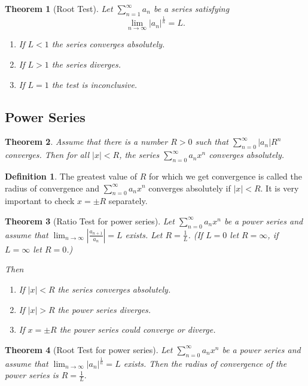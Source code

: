 \documentclass[11pt,a4paper]{article}
\newcommand\sumOfSeries{\sum_{n = 0}^{\infty}}
\newtheorem{theorem}{Theorem}
\theoremstyle{definition}
\newtheorem{definition}{Definition}
\begin{document}
\begin{theorem}[Root Test]
   Let $ \sum_{n = 1}^\infty a_n $ be a series satisfying
   \[ \lim_{n \to \infty} |a_n|^{\frac{1}{n}} = L.\] 
   \begin{enumerate}
       \item If $ L < 1 $ the series converges absolutely.
       \item If $ L > 1 $ the series diverges.
       \item If $ L = 1 $ the test is inconclusive.
   \end{enumerate}
\end{theorem}

\subsection{Power Series}

\begin{theorem}
    Assume that there is a number $ R > 0 $ such that $ \sumOfSeries |a_n|R^n $ converges.
    Then for all $ |x| < R $, the series $ \sumOfSeries a_n x^n $ converges absolutely. 
\end{theorem}

\begin{definition}
    The greatest value of $ R $ for which we get convergence is called the radius of convergence and $\sumOfSeries a_n x^n $ converges absolutely if $ |x| < R $.
    It is very important to check $ x = \pm R $ separately.
\end{definition}

\begin{theorem}[Ratio Test for power series]
    Let $ \sumOfSeries a_n x^n $ be a power series and assume that $ \lim_{n \to \infty} \left|\frac{a_{n + 1}}{a_n}\right| = L $ exists.
    Let $ R = \frac{1}{L} $. (If $ L = 0 $ let $ R = \infty $, if $ L = \infty $ let $ R = 0 $.) 
    
    Then
    \begin{enumerate}
        \item If $ |x| < R $ the series converges absolutely.
        \item If $ |x| > R $ the power series diverges. 
        \item If $ x = \pm R $ the power series could converge or diverge.
    \end{enumerate}
\end{theorem}

\begin{theorem}[Root Test for power series]
    Let $ \sumOfSeries a_n x^n $ be a power series and assume that $ \lim_{n \to \infty} \left|a_n\right|^{\frac{1}{n}}= L $ exists.
    Then the radius of convergence of the power series is $ R = \frac{1}{L}. $
\end{theorem}
\end{document}
